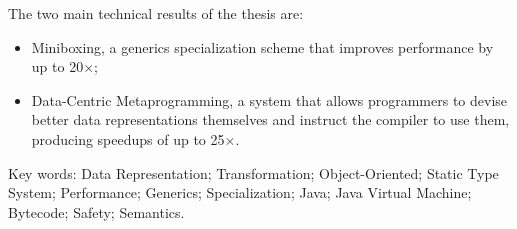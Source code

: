 \vspace{1em}

The two main technical results of the thesis are:

\begin{itemize}
  \item Miniboxing, a generics specialization scheme that improves performance by up to 20$\times$;
  \item Data-Centric Metaprogramming, a system that allows programmers to devise better data representations themselves and instruct the compiler to use them, producing speedups of up to 25$\times$.
\end{itemize}


\vskip0.5cm
Key words:
Data Representation; Transformation; Object-Oriented; Static Type System; Performance; Generics; Specialization; Java; Java Virtual Machine; Bytecode; Safety; Semantics.










